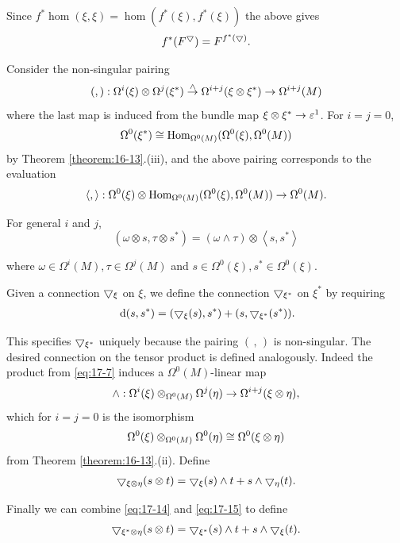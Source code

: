 Since $f^*\hom(\xi, \xi)  = \hom( {f^*(\xi),f^*(\xi) })$ the above gives
\begin{align}\label{eq:17-13}
  f^*({F}^\bigtriangledown)  = {F}^{f^*( \bigtriangledown ) }.
\end{align}

Consider the non-singular pairing
\[
  (,):\Omega^{i}(\xi)  \otimes  \Omega^{j}( \xi^*) 
  \overset{ \land  }{ \rightarrow  }
  \Omega^{i + j}( {\xi  \otimes  \xi^*})  \rightarrow  \Omega^{i + j}(M)
\]
where the last map is induced from the bundle map $\xi  \otimes  \xi^* \rightarrow  {\varepsilon }^1$. 
For $i = j = 0$,
\[
  \Omega^0( \xi^*)  \cong  {\operatorname{Hom}}_{\Omega^0(M) }( {\Omega^0(\xi),\Omega^0(M) })
\]
by Theorem \ref{theorem:16-13}.(iii), and the above pairing corresponds to the evaluation
\[
  \langle,\rangle :\Omega^0(\xi)  \otimes  {\operatorname{Hom}}_{\Omega^0(M) }( {\Omega^0(\xi),\Omega^0(M) }) \rightarrow  \Omega^0(M).
\]

For general $i$ and $j$,
\[
  ( {\omega  \otimes  s,\tau  \otimes  s^*})  
  = ( {\omega  \land  \tau })  \otimes  \left\langle  {s,s^*}\right\rangle
\]

where $\omega  \in  \Omega^{i}(M),\tau  \in  \Omega^{j}(M)$ and $s \in  \Omega^0(\xi),s^* \in  \Omega^0(\xi)$.

Given a connection $\bigtriangledown_{\xi }$ on $\xi$, we define the 
connection $\bigtriangledown_{\xi^*}$ on $\xi^*$ by requiring
\begin{align}\label{eq:17-14}
\dd(s,s^*)  = ( {\btd_{\xi }(s),s^*})  + ( {s,\btd_{\xi^*}( s^*) }).
\end{align}

This specifies $\bigtriangledown_{\xi^*}$ uniquely because the pairing $(\,,\,)$ is non-singular. 
The desired connection on the tensor product is defined analogously. Indeed the product from \eqref{eq:17-7} induces 
a $\Omega^0(M)$-linear map
\[
  \land  :\Omega^{i}(\xi) \otimes_{\Omega^0(M) }\Omega^{j}( \eta )  \rightarrow  \Omega^{i + j}( {\xi  \otimes  \eta }),
\]
which for $i = j = 0$ is the isomorphism
\[
  \Omega^0(\xi) \otimes_{\Omega^0(M) }\Omega^0( \eta )  \cong  \Omega^0( {\xi  \otimes  \eta })
\]
from Theorem \ref{theorem:16-13}.(ii). Define
\begin{align}\label{eq:17-15}
  \bigtriangledown_{\xi  \otimes  \eta }( {s \otimes  t})  
  = \bigtriangledown_{\xi }(s)  \land  t + s \land  \bigtriangledown_{\eta }(t).
\end{align}

Finally we can combine \eqref{eq:17-14} and \eqref{eq:17-15} to define
\[
\bigtriangledown_{\xi^* \otimes  \eta }( {s \otimes  t})  = \bigtriangledown_{\xi^*}(s)  \land  t + s \land  \bigtriangledown_{\xi }(t).
\]

